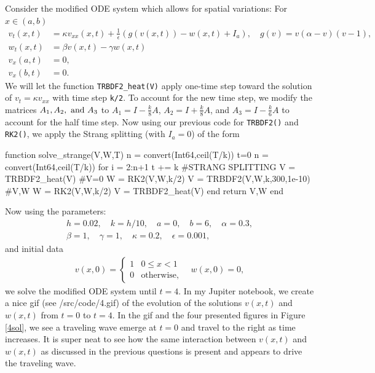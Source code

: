 \documentclass[12pt]{report}
\begin{document}
\begin{solution}
    \noindent
    Consider the modified ODE system which allows for spatial variations: For $x \in (a,b)$
\begin{align*}
v_t(x,t) &= \kappa v_{xx}(x,t)+  \frac 1 \epsilon \left( g(v(x,t)) - w(x,t) + I_a \right), \quad g(v) = v (\alpha - v) (v-1),\\
w_t(x,t) &= \beta v(x,t) - \gamma w(x,t)\\
v_x(a,t) & = 0,\\
v_x(b,t) & = 0.
\end{align*}
We will let the function \verb`TRBDF2_heat(V)` apply one-time step toward the solution of $v_t = \kappa v_{xx}$ with time step \verb`k/2`. To account for the new time step, we modify the matrices $A_1,A_2,{~\text{and}~} A_3$ to $A_1 = I - \frac{k}{8}A$, $A_2 = I + \frac{k}{8}A$, and $A_3 = I - \frac{k}{6}A$ to account for the half time step. Now using our previous code for \verb`TRBDF2()` and \verb`RK2()`, we apply the Strang splitting (with $I_a = 0$) of the form
\begin{jllisting}
function solve_strange(V,W,T)
    n = convert(Int64,ceil(T/k))  
    t=0
    n = convert(Int64,ceil(T/k))  
    for i = 2:n+1
        t += k
        #STRANG SPLITTING
        V = TRBDF2_heat(V) #V=0
        W = RK2(V,W,k/2)
        V = TRBDF2(V,W,k,300,1e-10) #V,W
        W = RK2(V,W,k/2)
        V = TRBDF2_heat(V)
    end
    return V,W
end
\end{jllisting}
Now using the parameters:
\begin{align*}
h = 0.02, \quad k = h/10, \quad a = 0, \quad b = 6, \quad \alpha = 0.3,\\
\beta = 1, \quad \gamma = 1, \quad \kappa = 0.2, \quad \epsilon = 0.001,
\end{align*}
and initial data
\begin{align*}
    v(x,0) = \begin{cases} 1 &0 \leq x < 1 \\
    0 & \text{otherwise},
    \end{cases} \quad w(x,0) = 0,
\end{align*}
we solve the modified ODE system until $t = 4$. In my Jupiter notebook, we create a nice gif (see /src/code/4.gif) of the evolution of the solutions $v(x,t)$ and $w(x,t)$ from $t=0$ to $t=4$. In the gif and the four presented figures in Figure \ref{4sol}, we see a traveling wave emerge at $t=0$ and travel to the right as time increases. It is super neat to see how the same interaction between $v(x,t)$ and $w(x,t)$ as discussed in the previous questions is present and appears to drive the traveling wave.   



\end{solution}
\end{document}
